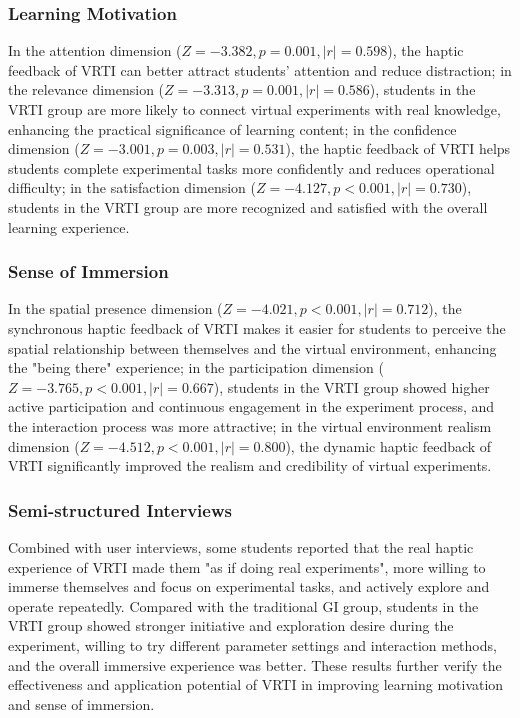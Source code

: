 \documentclass[runningheads]{llncs}
\begin{document}
\subsubsection{Learning Motivation}
In the attention dimension (\(Z=-3.382,p=0.001,|r|=0.598\)), the haptic feedback of VRTI can better attract students' attention and reduce distraction; in the relevance dimension (\(Z=-3.313,p=0.001,|r|=0.586\)), students in the VRTI group are more likely to connect virtual experiments with real knowledge, enhancing the practical significance of learning content; in the confidence dimension (\(Z=-3.001,p=0.003,|r|=0.531\)), the haptic feedback of VRTI helps students complete experimental tasks more confidently and reduces operational difficulty; in the satisfaction dimension (\(Z=-4.127,p<0.001,|r|=0.730\)), students in the VRTI group are more recognized and satisfied with the overall learning experience.

\subsubsection{Sense of Immersion}
In the spatial presence dimension (\(Z=-4.021,p<0.001,|r|=0.712\)), the synchronous haptic feedback of VRTI makes it easier for students to perceive the spatial relationship between themselves and the virtual environment, enhancing the "being there" experience; in the participation dimension (\(Z=-3.765,p<0.001,|r|=0.667\)), students in the VRTI group showed higher active participation and continuous engagement in the experiment process, and the interaction process was more attractive; in the virtual environment realism dimension (\(Z=-4.512,p<0.001,|r|=0.800\)), the dynamic haptic feedback of VRTI significantly improved the realism and credibility of virtual experiments.

\subsubsection {Semi-structured Interviews}
Combined with user interviews, some students reported that the real haptic experience of VRTI made them "as if doing real experiments", more willing to immerse themselves and focus on experimental tasks, and actively explore and operate repeatedly. Compared with the traditional GI group, students in the VRTI group showed stronger initiative and exploration desire during the experiment, willing to try different parameter settings and interaction methods, and the overall immersive experience was better. These results further verify the effectiveness and application potential of VRTI in improving learning motivation and sense of immersion.
\end{document}
